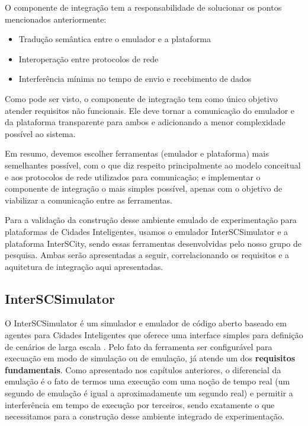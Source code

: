 O componente de integração tem a responsabilidade de solucionar os pontos mencionados anteriormente:

\begin{itemize}
    \item Tradução semântica entre o emulador e a plataforma

    \item Interoperação entre protocolos de rede

    \item Interferência mínima no tempo de envio e recebimento de dados
\end{itemize}

Como pode ser visto, o componente de integração tem como único objetivo atender requisitos não funcionais.
Ele deve tornar a comunicação do emulador e da plataforma transparente para ambos e adicionando a menor complexidade possível ao sistema.

Em resumo, devemos escolher ferramentas (emulador e plataforma) mais semelhantes possível, com o que diz respeito principalmente ao modelo conceitual e aos protocolos de
rede utilizados para comunicação; e implementar o componente de integração o mais simples possível, apenas com o objetivo de viabilizar a comunicação entre as ferramentas.

Para a validação da construção desse ambiente emulado de experimentação para plataformas de Cidades Inteligentes, usamos o emulador InterSCSimulator e a plataforma InterSCity,
sendo essas ferramentas desenvolvidas pelo nosso grupo de pesquisa. Ambas serão apresentadas a seguir, correlacionando os requisitos e a aquitetura de integração aqui
apresentadas.

\subsection{InterSCSimulator}

O InterSCSimulator é um simulador e emulador de código aberto baseado em agentes para Cidades Inteligentes que oferece uma interface simples para definição de
cenários de larga escala \cite{santana_17}.
Pelo fato da ferramenta ser configurável para execuação em modo de simulação ou de emulação, já atende um dos \textbf{requisitos fundamentais}.
Como apresentado nos capítulos anteriores, o diferencial da emulação é o fato de termos uma execução com uma noção de tempo real (um segundo de emulação é igual a
aproximadamente um segundo real) e permitir a interferência em tempo de execução por terceiros, sendo exatamente o que necessitamos para a construção desse
ambiente integrado de experimentação.

